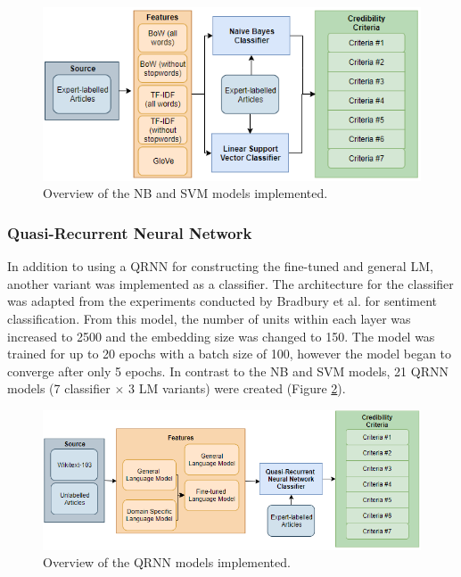\documentclass[a4paper,twoside,phd]{BYUPhys}
\begin{document}
\begin{figure}[H]
	\centering
	\includegraphics[totalheight=6cm]{images/ml-models.png}
	\caption{Overview of the NB and SVM models implemented.}
	\label{fig:MLModels}
\end{figure}

\subsubsection{Quasi-Recurrent Neural Network}
\label{sec:ModelQRNN}

In addition to using a QRNN for constructing the fine-tuned and general LM, another variant was implemented as a classifier. The architecture for the classifier was adapted from the experiments conducted by Bradbury et al. \cite{bradbury2016quasi} for sentiment classification. From this model, the number of units within each layer was increased to 2500 and the embedding size was changed to 150. The model was trained for up to 20 epochs with a batch size of 100, however the model began to converge after only 5 epochs. In contrast to the NB and SVM models, 21 QRNN models (7 classifier $\times$ 3 LM variants) were created (Figure \ref{fig:DLModels}).

\begin{figure}[H]
	\centering
	\includegraphics[totalheight=5.6cm]{images/dl-models.png}
	\caption{Overview of the QRNN models implemented.}
	\label{fig:DLModels}
\end{figure}
\end{document}
